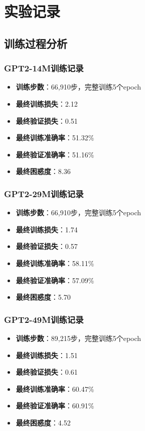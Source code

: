 \documentclass{article}
\begin{document}
\section{实验记录}

\subsection{训练过程分析}

\subsubsection{GPT2-14M训练记录}
\begin{itemize}
    \item \textbf{训练步数}：66,910步，完整训练5个epoch
    \item \textbf{最终训练损失}：2.12
    \item \textbf{最终验证损失}：0.51
    \item \textbf{最终训练准确率}：51.32\%
    \item \textbf{最终验证准确率}：51.16\%
    \item \textbf{最终困惑度}：8.36
\end{itemize}

\subsubsection{GPT2-29M训练记录}
\begin{itemize}
    \item \textbf{训练步数}：66,910步，完整训练5个epoch
    \item \textbf{最终训练损失}：1.74
    \item \textbf{最终验证损失}：0.57
    \item \textbf{最终训练准确率}：58.11\%
    \item \textbf{最终验证准确率}：57.09\%
    \item \textbf{最终困惑度}：5.70
\end{itemize}

\subsubsection{GPT2-49M训练记录}
\begin{itemize}
    \item \textbf{训练步数}：89,215步，完整训练5个epoch
    \item \textbf{最终训练损失}：1.51
    \item \textbf{最终验证损失}：0.61
    \item \textbf{最终训练准确率}：60.47\%
    \item \textbf{最终验证准确率}：60.91\%
    \item \textbf{最终困惑度}：4.52
\end{itemize}
\end{document}
